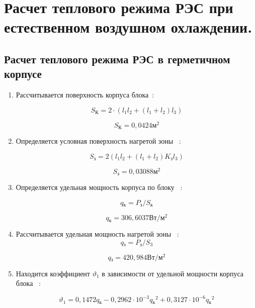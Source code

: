 \section{Расчет теплового режима РЭС при естественном воздушном охлаждении.}
\subsection{Расчет теплового режима РЭС в герметичном корпусе}
\begin{enumerate}[label={\arabic*.}]
  
\item Рассчитывается поверхность корпуса блока~\cite{Rotkop1976}:

  \begin{equation}
S\mathrm{_{К}} = 2 \cdot \left(l_1 l_2 + \left(l_1+ l_2 \right)l_3\right) %
  \end{equation}

  $$S\mathrm{_{К}}=0,0424\mathrm{м^2}$$

\item Определяется условная поверхность нагретой зоны ~\cite{Rotkop1976}:

  \begin{equation}
    S\mathrm{_{з}} = 2 \left(l_1 l_2 + \left(l_1 + l_2\right) K\mathrm{_{з}} l_3 \right) %
  \end{equation}

  $$S\mathrm{_{з}} = 0,03088\mathrm{м^2}$$

\item Определяется удельная мощность корпуса по блоку ~\cite{Rotkop1976}:

\begin{equation}
  q\mathrm{_к} = P\mathrm{_з}/S\mathrm{_к} %
\end{equation}

$$q\mathrm{_к} = 306,6037\mathrm{Вт/м^2}$$

\item Рассчитывается удельная мощность нагретой зоны ~\cite{Rotkop1976}:
  \begin{equation}
      q\mathrm{_з} = P\mathrm{_з}/S\mathrm{_3} %
    \end{equation}

    $$q\mathrm{_з} = 420,984 \mathrm{ Вт/м^2}$$

\item Находится коэффициент $\vartheta_1$ в зависимости от удельной мощности корпуса блока ~\cite{Rotkop1976}:
    
\begin{equation}
\vartheta_1 = 0,1472q\mathrm{_к} - 0,2962 \cdot 10^{-3}q\mathrm{_к}^2 + 0,3127 \cdot 10^{-6}q\mathrm{_к}^2
\end{equation}


\end{enumerate}
